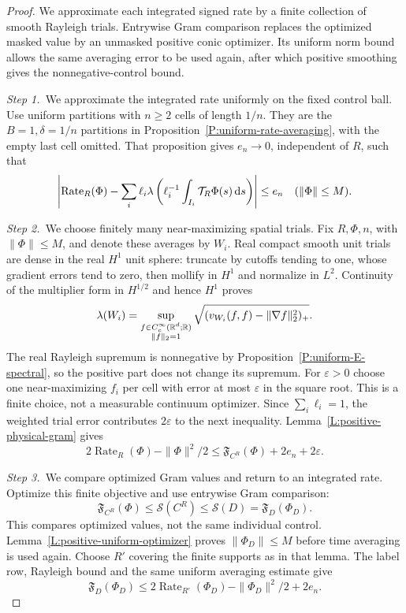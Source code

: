 \begin{proof}
  We approximate each integrated signed rate by a finite collection of smooth
  Rayleigh trials. Entrywise Gram comparison replaces the optimized masked
  value by an unmasked positive conic optimizer. Its uniform norm bound allows
  the same averaging error to be used again, after which positive smoothing
  gives the nonnegative-control bound.


  \medskip
  \noindent\textit{Step 1.~}We approximate the integrated rate uniformly on
  the fixed control ball.
  Use uniform partitions with $n \ge 2$ cells of length $1/n$. They are the $B =
  1,\delta = 1/n$ partitions in Proposition~\ref{P:uniform-rate-averaging}, with
  the empty last cell omitted. That proposition gives $e_n \to 0$, independent
  of $R$, such that
  \[
    \left|\operatorname{Rate}_R(\Phi)
    -\sum_i\ell_i\lambda\left(\ell_i^{-1}
    \int_{I_i}\mathcal{T}_R\Phi(s)\,\mathrm{d} s\right)\right|\le e_n
    \quad(\|\Phi\|\le M).
  \]

  \medskip
  \noindent\textit{Step 2.~}We choose finitely many near-maximizing spatial
  trials.
  Fix $R,\Phi,n$, with $\|\Phi\| \le M$, and denote these averages by $W_i$.
  Real compact smooth unit trials are dense in the real $H^1$ unit sphere:
  truncate by cutoffs tending to one, whose gradient errors tend to zero, then
  mollify in $H^1$ and normalize in $L^2$. Continuity of the multiplier form in
  $H^{1/2}$ and hence $H^1$ proves
  \[
    \lambda(W_i)=
    \sup_{\substack{f\in C_c^\infty(\mathbb{R}^d;\mathbb{R})\\\|f\|_2=1}}
    \sqrt{(v_{W_i}(f,f)-\|\nabla f\|_2^2)_+}.
  \]
  The real Rayleigh supremum is nonnegative by
  Proposition~\ref{P:uniform-E-spectral}, so the positive part does not change
  its supremum. For $\varepsilon > 0$ choose one near-maximizing $f_i$ per cell
  with error at most $\varepsilon$ in the square root. This is a finite choice,
  not a measurable continuum optimizer. Since $\sum_i\ell_i = 1$, the weighted
  trial error contributes $2\varepsilon$ to the next inequality.
  Lemma~\ref{L:positive-physical-gram} gives
  \[
    2\operatorname{Rate}_R(\Phi)-\|\Phi\|^2/2
    \le\mathfrak{F}_{C^R}(\Phi)+2e_n+2\varepsilon .
  \]

  \medskip
  \noindent\textit{Step 3.~}We compare optimized Gram values and return to an
  integrated rate.
  Optimize this finite objective and use entrywise Gram comparison:
  \[
    \mathfrak{F}_{C^R}(\Phi)
    \le\mathscr{S}(C^R)\le\mathscr{S}(D)=\mathfrak{F}_D(\Phi_D).
  \]
  This compares optimized values, not the same individual control.
  Lemma~\ref{L:positive-uniform-optimizer} proves $\|\Phi_D\| \le M$ before time
  averaging is used again. Choose $R'$ covering the finite supports as in that
  lemma. The label row, Rayleigh bound and the same uniform averaging estimate
  give
  \begin{equation}\label{E:positive-finite-optimizer-bound}
    \mathfrak{F}_D(\Phi_D)
    \le2\operatorname{Rate}_{R'}(\Phi_D)-\|\Phi_D\|^2/2+2e_n .
  \end{equation}



\end{proof}
